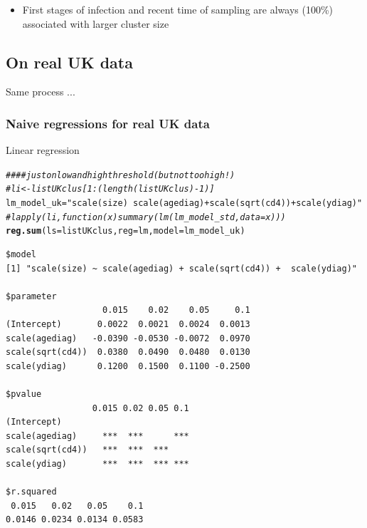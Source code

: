\documentclass[]{revtex4}\usepackage[]{graphicx}\usepackage[]{color}
\makeatletter
\newcommand{\hlstr}[1]{\textcolor[rgb]{0.192,0.494,0.8}{#1}}%
\newcommand{\hlcom}[1]{\textcolor[rgb]{0.678,0.584,0.686}{\textit{#1}}}%
\newcommand{\hlstd}[1]{\textcolor[rgb]{0.345,0.345,0.345}{#1}}%
\newcommand{\hlkwb}[1]{\textcolor[rgb]{0.69,0.353,0.396}{#1}}%
\newcommand{\hlkwc}[1]{\textcolor[rgb]{0.333,0.667,0.333}{#1}}%
\newcommand{\hlkwd}[1]{\textcolor[rgb]{0.737,0.353,0.396}{\textbf{#1}}}%
\newenvironment{kframe}{%
 \def\at@end@of@kframe{}%
 \ifinner\ifhmode%
  \def\at@end@of@kframe{\end{minipage}}%
  \begin{minipage}{\columnwidth}%
 \fi\fi%
 \def\FrameCommand##1{\hskip\@totalleftmargin \hskip-\fboxsep
 \colorbox{shadecolor}{##1}\hskip-\fboxsep
     \hskip-\linewidth \hskip-\@totalleftmargin \hskip\columnwidth}%
 \MakeFramed {\advance\hsize-\width
   \@totalleftmargin\z@ \linewidth\hsize
   \@setminipage}}%
 {\par\unskip\endMakeFramed%
 \at@end@of@kframe}
\newenvironment{knitrout}{}{} %
\makeatother
\begin{document}
\begin{knitrout}
{}



\end{knitrout}
 \begin{itemize}
\item First stages of infection and recent time of sampling are always (100\%) associated with larger cluster size
 \end{itemize}
 
\subsection{On real UK data}
Same process ...




\subsubsection{Naive regressions for real UK data}
Linear regression
\begin{knitrout}
\color{fgcolor}\begin{kframe}
\begin{alltt}
\hlcom{#### just on low and high threshold (but not too high !)}
\hlcom{# li <- listUKclus[ 1:(length(listUKclus)-1) ]}
\hlstd{lm_model_uk} \hlkwb{=} \hlstr{"scale(size) ~ scale(agediag) + scale(sqrt(cd4)) +  scale(ydiag)"}
\hlcom{# lapply(li, function(x) summary(lm(lm_model_std, data = x)))}
\hlkwd{reg.sum}\hlstd{(}\hlkwc{ls} \hlstd{= listUKclus,} \hlkwc{reg} \hlstd{= lm,} \hlkwc{model} \hlstd{= lm_model_uk)}
\end{alltt}
\begin{verbatim}
$model
[1] "scale(size) ~ scale(agediag) + scale(sqrt(cd4)) +  scale(ydiag)"

$parameter
                   0.015    0.02    0.05     0.1
(Intercept)       0.0022  0.0021  0.0024  0.0013
scale(agediag)   -0.0390 -0.0530 -0.0072  0.0970
scale(sqrt(cd4))  0.0380  0.0490  0.0480  0.0130
scale(ydiag)      0.1200  0.1500  0.1100 -0.2500

$pvalue
                 0.015 0.02 0.05 0.1
(Intercept)                         
scale(agediag)     ***  ***      ***
scale(sqrt(cd4))   ***  ***  ***    
scale(ydiag)       ***  ***  *** ***

$r.squared
 0.015   0.02   0.05    0.1 
0.0146 0.0234 0.0134 0.0583 
\end{verbatim}
\end{kframe}
\end{knitrout}
\end{document}
